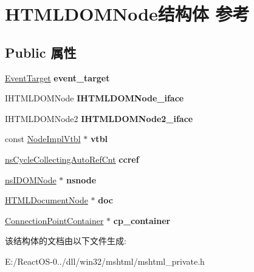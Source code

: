 \hypertarget{struct_h_t_m_l_d_o_m_node}{}\section{H\+T\+M\+L\+D\+O\+M\+Node结构体 参考}
\label{struct_h_t_m_l_d_o_m_node}
\subsection*{Public 属性}
\begin{DoxyCompactItemize}
\item 
\mbox{\label{struct_h_t_m_l_d_o_m_node_af4d898010efffec06e1df60f9fae2210}} 
\hyperlink{struct_event_target}{Event\+Target} {\bfseries event\+\_\+target}
\item 
\mbox{\label{struct_h_t_m_l_d_o_m_node_afdd8618ab6db968337bd3c6b777477d6}} 
I\+H\+T\+M\+L\+D\+O\+M\+Node {\bfseries I\+H\+T\+M\+L\+D\+O\+M\+Node\+\_\+iface}
\item 
\mbox{\label{struct_h_t_m_l_d_o_m_node_a88080b021a30737fb0a204495668744f}} 
I\+H\+T\+M\+L\+D\+O\+M\+Node2 {\bfseries I\+H\+T\+M\+L\+D\+O\+M\+Node2\+\_\+iface}
\item 
\mbox{\label{struct_h_t_m_l_d_o_m_node_ab88a3c7334f824fed298026a7706f684}} 
const \hyperlink{struct_node_impl_vtbl}{Node\+Impl\+Vtbl} $\ast$ {\bfseries vtbl}
\item 
\mbox{\label{struct_h_t_m_l_d_o_m_node_aa3f5594d5a55e63673de5412196fd99c}} 
\hyperlink{structns_cycle_collecting_auto_ref_cnt}{ns\+Cycle\+Collecting\+Auto\+Ref\+Cnt} {\bfseries ccref}
\item 
\mbox{\label{struct_h_t_m_l_d_o_m_node_a3d53c7428e7895b707b735acdb937989}} 
\hyperlink{interfacens_i_d_o_m_node}{ns\+I\+D\+O\+M\+Node} $\ast$ {\bfseries nsnode}
\item 
\mbox{\label{struct_h_t_m_l_d_o_m_node_af5984b867c4663868263698ce04b0111}} 
\hyperlink{struct_h_t_m_l_document_node}{H\+T\+M\+L\+Document\+Node} $\ast$ {\bfseries doc}
\item 
\mbox{\label{struct_h_t_m_l_d_o_m_node_a237faa2f14f68bcedde1e8c626a90abb}} 
\hyperlink{struct_connection_point_container}{Connection\+Point\+Container} $\ast$ {\bfseries cp\+\_\+container}
\end{DoxyCompactItemize}


该结构体的文档由以下文件生成\+:\begin{DoxyCompactItemize}
\item 
E\+:/\+React\+O\+S-\/0../dll/win32/mshtml/mshtml\+\_\+private.\+h\end{DoxyCompactItemize}
